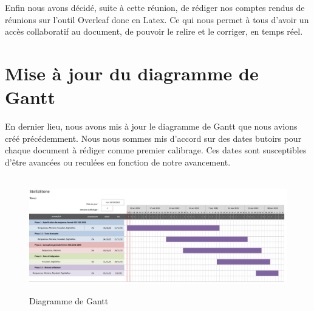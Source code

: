\documentclass[a4paper, 12pt]{article}
\begin{document}
Enfin nous avons décidé, suite à cette réunion, de rédiger nos comptes rendus de réunions sur l'outil Overleaf donc en Latex. Ce qui nous permet à tous d'avoir un accès collaboratif au document, de pouvoir le relire et le corriger, en temps réel. 

\newpage
\section{Mise à jour du diagramme de Gantt}

En dernier lieu, nous avons mis à jour le diagramme de Gantt que nous avions créé précédemment. Nous nous sommes mis d'accord sur des dates butoirs pour chaque document à rédiger comme premier calibrage. Ces dates sont susceptibles d'être avancées ou reculées en fonction de notre avancement. 
\\\\
 \begin{figure}[!h]
    \centering
    \includegraphics[scale=0.45]{Diagramme de gantt.png}
    \label{fig:Tache_semaine}
    \caption{Diagramme de Gantt}
\end{figure}
\end{document}
